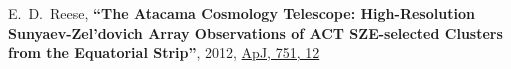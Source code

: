 \documentclass{article}
\def\myself{\textbf{\color{red} C.~Sif\'on}}
\newcommand{\paper}[1]{\textbf{``#1''}}
\begin{document}
\begin{etaremune}
\item
E.~D.~Reese, 
\paper{The Atacama Cosmology Telescope: High-Resolution Sunyaev-Zel'dovich Array Observations of ACT
SZE-selected Clusters from the Equatorial Strip}, 
2012, \href{http://adsabs.harvard.edu/adsabs/abs/2012ApJ...751...12R}{ApJ, 751, 12}


\end{etaremune}
\end{document}

